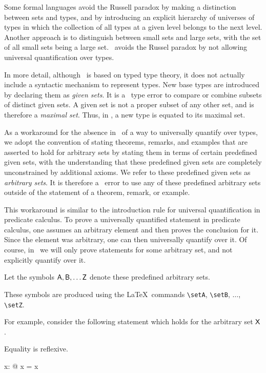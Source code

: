 \documentclass{amsart}
\begin{document}
Some formal languages avoid the Russell paradox by making a distinction between sets and types,
and by introducing an explicit hierarchy of universes of types in which the collection of all types at a given level belongs to the next level.
Another approach is to distinguish between small sets and large sets, with the set of all small sets being a large set.
\ZN\ avoids the Russel paradox by not allowing universal quantification over types.

In more detail, although \ZN\ is based on typed type theory, 
it does not actually include a syntactic mechanism to represent types. 
New base types are introduced by declaring them as \textit{given sets}.
It is a \ZN\ type error to compare or combine subsets of distinct given sets.
A given set is not a proper subset of any other set, and is therefore a \textit{maximal set}.
Thus, in \ZN, a new type is equated to its maximal set.

As a workaround for the absence in \ZN\ of a way to universally quantify over types, 
we adopt the convention of stating theorems, remarks, and examples that are asserted to hold for arbitrary sets 
by stating them in terms of certain predefined given sets, with the understanding that these 
predefined given sets are completely unconstrained by additional axioms.
We refer to these predefined given sets as \textit{arbitrary sets}.
It is therefore a \mathz\ error to use any of these predefined arbitrary sets outside of the statement of a theorem, remark, or example.

This workaround is similar to the introduction rule for universal quantification in predicate calculus.
To prove a universally quantified statement in predicate calculus, one assumes an arbitrary element and then proves the conclusion for it.
Since the element was arbitrary, one can then universally quantify over it.
Of course, in \mathz\ we will only prove statements for some arbitrary set, and not explicitly quantify over it.

Let the symbols $\mathsf{A}, \mathsf{B}, \dots \mathsf{Z}$ denote these predefined arbitrary sets.
\begin{zed}
	[\setA, \setB, \setC, \setD, \setE, \setF, \setG, \setH, \setI, \setJ, \setK, \setL, \setM, 
	\setN, \setO, \setP, \setQ, \setR, \setS, \setT, \setU, \setV, \setW, \setX, \setY, \setZ]
\end{zed}
These symbols are produced using the \LaTeX\ commands \verb|\setA|, \verb|\setB|, $\dots$, \verb|\setZ|.

For example, consider the following statement which holds for the arbitrary set $\mathsf{X}$.
\begin{remark}
Equality is reflexive.
\begin{zed}
	\forall x: \setX @ x = x
\end{zed}
\end{remark}

\printbibliography
\end{document}
